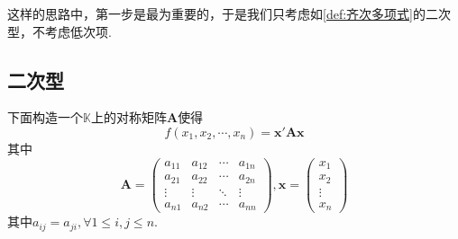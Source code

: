 这样的思路中，第一步是最为重要的，于是我们只考虑如\cref{def:齐次多项式}的二次型，不考虑低次项.
\subsection{二次型}
下面构造一个$\mathbb{K}$上的对称矩阵$\bm{A}$使得\[
    f\left(
    x_1,x_2,\cdots,x_n
    \right)=\bm{x}'\bm{Ax}
\]其中\[
    \bm{A}=\begin{pmatrix}
        a_{11} & a_{12} & \cdots & a_{1n} \\
        a_{21} & a_{22} & \cdots & a_{2n} \\
        \vdots & \vdots & \ddots & \vdots \\
        a_{n1} & a_{n2} & \cdots & a_{nn}
    \end{pmatrix},\bm{x}=\begin{pmatrix}
        x_1 \\x_2\\\vdots\\x_n
    \end{pmatrix}
\]其中$a_{ij}=a_{ji},\forall 1\leqslant i,j\leqslant n$.

